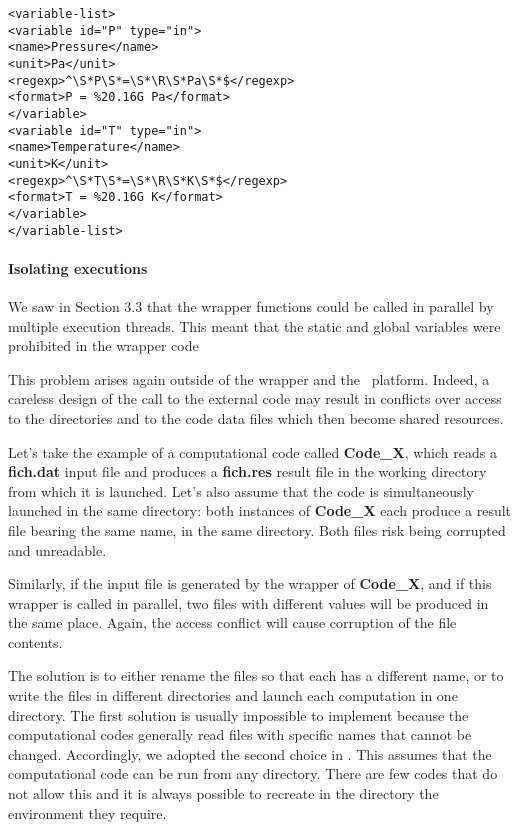\lstset{language=XML, basicstyle=\normalsize}
\begin{lstlisting}[frame=TBRL]
<variable-list>
<variable id="P" type="in">
<name>Pressure</name>
<unit>Pa</unit>
<regexp>^\S*P\S*=\S*\R\S*Pa\S*$</regexp>
<format>P = %20.16G Pa</format>
</variable>
<variable id="T" type="in">
<name>Temperature</name>
<unit>K</unit>
<regexp>^\S*T\S*=\S*\R\S*K\S*$</regexp>
<format>T = %20.16G K</format>
</variable>
</variable-list>
\end{lstlisting}

\paragraph{Isolating executions}

We saw in Section 3.3 that the wrapper functions could be called in parallel by multiple execution threads. This meant that the static and global variables were prohibited in the wrapper code%

This problem arises again outside of the wrapper and the \OT\ platform. Indeed, a careless design of the call to the external code may result in conflicts over access to the directories and to the code data files which then become shared resources.

Let's take the example of a computational code called {\bf Code\_X}, which reads a {\bf fich.dat} input file and produces a {\bf fich.res} result file in the working directory from which it is launched. Let's also assume that the code is simultaneously launched in the same directory: both instances of {\bf Code\_X} each produce a result file bearing the same name, in the same directory. Both files risk being corrupted and unreadable.

Similarly, if the input file is generated by the wrapper of {\bf Code\_X}, and if this wrapper is called in parallel, two files with different values will be produced in the same place. Again, the access conflict will cause corruption of the file contents.

The solution is to either rename the files so that each has a different name, or to write the files in different directories and launch each computation in one directory. The first solution is usually impossible to implement because the computational codes generally read files with specific names that cannot be changed. Accordingly, we adopted the second choice in \OT. This assumes that the computational code can be run from any directory. There are few codes that do not allow this and it is always possible to recreate in the directory the environment they require.

